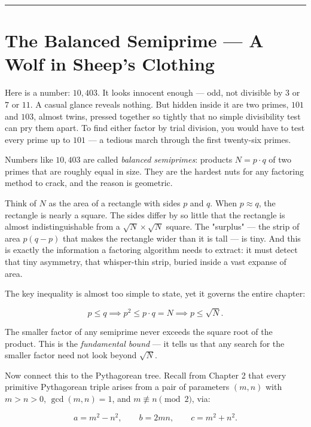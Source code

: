 \documentclass[11pt,openany]{book}
\theoremstyle{definition}
\theoremstyle{plain}
\theoremstyle{remark}
\begin{document}
\bigskip\noindent\rule{\textwidth}{0.4pt}\bigskip


\section*{The Balanced Semiprime — A Wolf in Sheep's Clothing}


Here is a number: $10{,}403$. It looks innocent enough — odd, not divisible by $3$ or $7$ or $11$. A casual glance reveals nothing. But hidden inside it are two primes, $101$ and $103$, almost twins, pressed together so tightly that no simple divisibility test can pry them apart. To find either factor by trial division, you would have to test every prime up to $101$ — a tedious march through the first twenty-six primes.

Numbers like $10{,}403$ are called \textit{balanced semiprimes}: products $N = p \cdot q$ of two primes that are roughly equal in size. They are the hardest nuts for any factoring method to crack, and the reason is geometric.

Think of $N$ as the area of a rectangle with sides $p$ and $q$. When $p \approx q$, the rectangle is nearly a square. The sides differ by so little that the rectangle is almost indistinguishable from a $\sqrt{N} \times \sqrt{N}$ square. The "surplus" — the strip of area $p(q - p)$ that makes the rectangle wider than it is tall — is tiny. And this is exactly the information a factoring algorithm needs to extract: it must detect that tiny asymmetry, that whisper-thin strip, buried inside a vast expanse of area.

The key inequality is almost too simple to state, yet it governs the entire chapter:

$$p \le q \implies p^2 \le p \cdot q = N \implies p \le \sqrt{N}.$$

The smaller factor of any semiprime never exceeds the square root of the product. This is the \textit{fundamental bound} — it tells us that any search for the smaller factor need not look beyond $\sqrt{N}$.

Now connect this to the Pythagorean tree. Recall from Chapter 2 that every primitive Pythagorean triple arises from a pair of parameters $(m, n)$ with $m > n > 0$, $\gcd(m, n) = 1$, and $m \not\equiv n \pmod{2}$, via:

$$a = m^2 - n^2, \qquad b = 2mn, \qquad c = m^2 + n^2.$$
\end{document}

